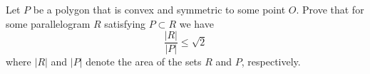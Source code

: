 Let $P$ be a polygon that is convex and symmetric to some point $O$. Prove that for some parallelogram $R$ satisfying $P \subset R$ we have
\[
\frac{|R|}{|P|} \leq \sqrt{2}
\]
where $|R|$ and $|P|$ denote the area of the sets $R$ and $P$, respectively.
